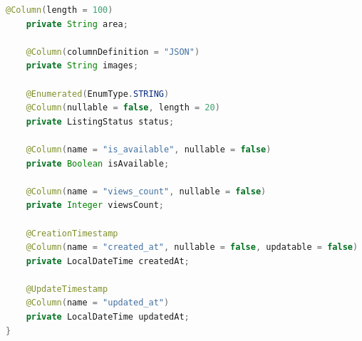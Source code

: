 \begin{lstlisting}[language=Java, caption={Product.java JPA Entity}]
    @Column(length = 100)
    private String area;

    @Column(columnDefinition = "JSON")
    private String images;

    @Enumerated(EnumType.STRING)
    @Column(nullable = false, length = 20)
    private ListingStatus status;

    @Column(name = "is_available", nullable = false)
    private Boolean isAvailable;

    @Column(name = "views_count", nullable = false)
    private Integer viewsCount;

    @CreationTimestamp
    @Column(name = "created_at", nullable = false, updatable = false)
    private LocalDateTime createdAt;

    @UpdateTimestamp
    @Column(name = "updated_at")
    private LocalDateTime updatedAt;
}
\end{lstlisting}

